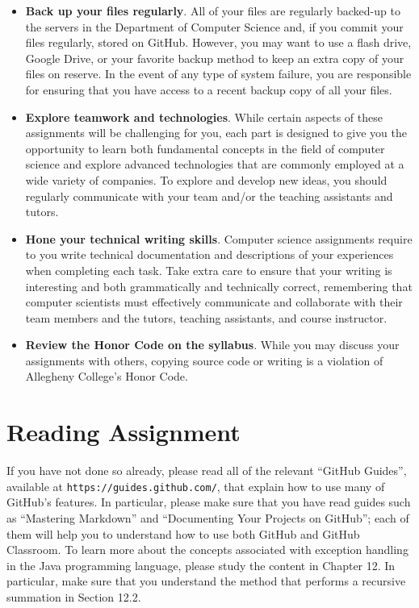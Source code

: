 \documentclass[11pt]{article}
\newcommand{\url}[1]{\lstinline{#1}}
\begin{document}
\begin{itemize}
\item {\bf Back up your files regularly}. All of your files are regularly backed-up to the servers in the Department of
  Computer Science and, if you commit your files regularly, stored on GitHub. However, you may want to use a flash
  drive, Google Drive, or your favorite backup method to keep an extra copy of your files on reserve. In the event of
  any type of system failure, you are responsible for ensuring that you have access to a recent backup copy of all your
  files.

\item {\bf Explore teamwork and technologies}. While certain aspects of these assignments will be challenging for you,
  each part is designed to give you the opportunity to learn both fundamental concepts in the field of computer science
  and explore advanced technologies that are commonly employed at a wide variety of companies. To explore and develop
  new ideas, you should regularly communicate with your team and/or the teaching assistants and tutors.

\item {\bf Hone your technical writing skills}. Computer science assignments require to you write technical
  documentation and descriptions of your experiences when completing each task. Take extra care to ensure that your
  writing is interesting and both grammatically and technically correct, remembering that computer scientists must
  effectively communicate and collaborate with their team members and the tutors, teaching assistants, and course
  instructor.

\item {\bf Review the Honor Code on the syllabus}. While you may discuss your assignments with others, copying source
  code or writing is a violation of Allegheny College's Honor Code.

\end{itemize}

\section*{Reading Assignment}

If you have not done so already, please read all of the relevant ``GitHub
Guides'', available at \url{https://guides.github.com/}, that explain how to use
many of GitHub's features. In particular, please make sure that you have read
guides such as ``Mastering Markdown'' and ``Documenting Your Projects on
GitHub''; each of them will help you to understand how to use both GitHub and
GitHub Classroom. To learn more about the concepts associated with exception
handling in the Java programming language, please study the content in Chapter
12. In particular, make sure that you understand the method that performs a
recursive summation in Section 12.2.
\end{document}
